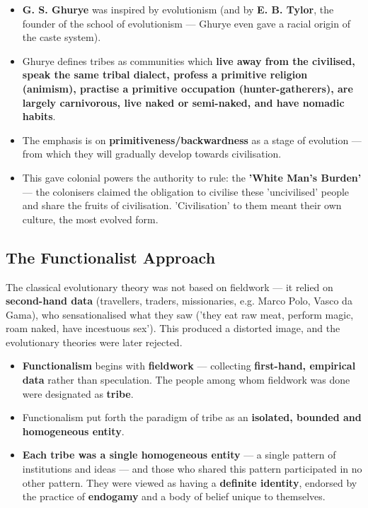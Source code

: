 \begin{GovtPolicy}
\begin{itemize}
\item \textbf{G. S. Ghurye} was inspired by evolutionism (and by \textbf{E. B. Tylor}, the founder of the school of evolutionism --- Ghurye even gave a racial origin of the caste system).
\item Ghurye defines tribes as communities which \textbf{live away from the civilised, speak the same tribal dialect, profess a primitive religion (animism), practise a primitive occupation (hunter-gatherers), are largely carnivorous, live naked or semi-naked, and have nomadic habits}.
\item The emphasis is on \textbf{primitiveness/backwardness} as a stage of evolution --- from which they will gradually develop towards civilisation.
\item This gave colonial powers the authority to rule: the \textbf{'White Man's Burden'} --- the colonisers claimed the obligation to civilise these 'uncivilised' people and share the fruits of civilisation. 'Civilisation' to them meant their own culture, the most evolved form.
\end{itemize}
\end{GovtPolicy}

\subsection{The Functionalist Approach}

The classical evolutionary theory was not based on fieldwork --- it relied on \textbf{second-hand data} (travellers, traders, missionaries, e.g. Marco Polo, Vasco da Gama), who sensationalised what they saw ('they eat raw meat, perform magic, roam naked, have incestuous sex'). This produced a distorted image, and the evolutionary theories were later rejected.

\begin{KeyConcept}
\begin{itemize}
\item \textbf{Functionalism} begins with \textbf{fieldwork} --- collecting \textbf{first-hand, empirical data} rather than speculation. The people among whom fieldwork was done were designated as \textbf{tribe}.
\item Functionalism put forth the paradigm of tribe as an \textbf{isolated, bounded and homogeneous entity}.
\item \textbf{Each tribe was a single homogeneous entity} --- a single pattern of institutions and ideas --- and those who shared this pattern participated in no other pattern. They were viewed as having a \textbf{definite identity}, endorsed by the practice of \textbf{endogamy} and a body of belief unique to themselves.
\end{itemize}
\end{KeyConcept}

